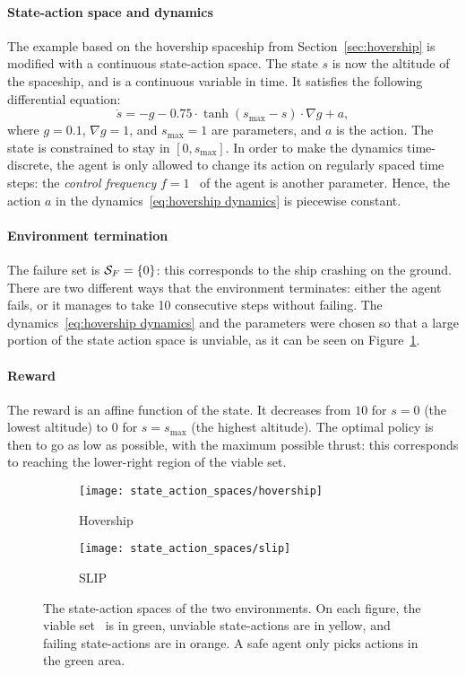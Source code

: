 \paragraph{State-action space and dynamics} The example based on the hovership spaceship from Section~\ref{sec:hovership} is modified with a continuous state-action space. The state $s$ is now the altitude of the spaceship, and is a continuous variable in time. It satisfies the following differential equation:
\begin{equation}
	\dot{s} =- g - 0.75\cdot\tanh\left(s_\text{max} - s\right)\cdot\nabla g + a, \label{eq:hovership dynamics}
\end{equation}
where $g=0.1$, $\nabla g = 1$, and $s_\text{max} = 1$ are parameters, and $a$ is the action. The state is constrained to stay in $[0, s_\text{max}]$. In order to make the dynamics time-discrete, the agent is only allowed to change its action on regularly spaced time steps: the\emph{ control frequency} $f = 1$ \hertz~of the agent is another parameter. Hence, the action $a$ in the dynamics~\eqref{eq:hovership dynamics} is piecewise constant.

\paragraph{Environment termination} The failure set is ${\mathcal{S}_{F}} = \{0\}$: this corresponds to the ship crashing on the ground. There are two different ways that the environment terminates: either the agent fails, or it manages to take 10 consecutive steps without failing. The dynamics~\eqref{eq:hovership dynamics} and the parameters were chosen so that a large portion of the state action space is unviable, as it can be seen on Figure~\ref{fig:state action spaces:hovership}.

\paragraph{Reward} The reward is an affine function of the state. It decreases from $10$ for $s=0$ (the lowest altitude) to $0$ for $s=s_\text{max}$ (the highest altitude). The optimal policy is then to go as low as possible, with the maximum possible thrust: this corresponds to reaching the lower-right region of the viable set.

\begin{figure}
	\centering
	\begin{subfigure}{0.45\textwidth}
		\centering
		\texttt{[image: state\_action\_spaces/hovership]}
		\caption{Hovership}
		\label{fig:state action spaces:hovership}
	\end{subfigure}
	\begin{subfigure}{0.45\textwidth}
		\centering
		\texttt{[image: state\_action\_spaces/slip]}
		\caption{SLIP}
		\label{fig:state action spaces:slip}
	\end{subfigure}
	\caption{The state-action spaces of the two environments. On each figure, the viable set \QV~is in green, unviable state-actions are in yellow, and failing state-actions are in orange. A safe agent only picks actions in the green area.}
\end{figure}


